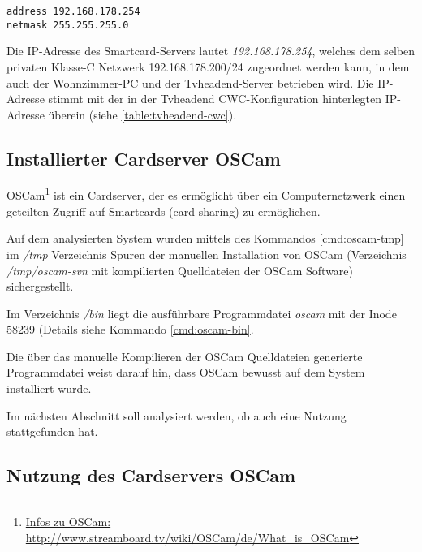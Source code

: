 \begin{verbatim}
address 192.168.178.254
netmask 255.255.255.0
\end{verbatim}

Die IP-Adresse des Smartcard-Servers lautet \textit{192.168.178.254}, welches dem selben privaten \mbox{Klasse-C} Netzwerk 192.168.178.200/24 zugeordnet werden kann, in dem auch der Wohnzimmer-PC und der Tvheadend-Server betrieben wird. Die IP-Adresse stimmt mit der in der Tvheadend CWC-Konfiguration hinterlegten IP-Adresse überein (siehe \autoref{table:tvheadend-cwc}).

\subsection{Installierter Cardserver OSCam}

OSCam\footnote{\href{http://www.streamboard.tv/wiki/OSCam/de/What\_is\_OSCam}{Infos zu OSCam: http://www.streamboard.tv/wiki/OSCam/de/What\_is\_OSCam}} ist ein Cardserver, der es ermöglicht über ein Computernetzwerk einen geteilten Zugriff auf Smartcards (card sharing) zu ermöglichen.

Auf dem analysierten System wurden mittels des Kommandos \autoref{cmd:oscam-tmp} im \textit{/tmp} Verzeichnis Spuren der manuellen Installation von OSCam (Verzeichnis \textit{/tmp/oscam-svn} mit kompilierten Quelldateien der OSCam Software) sichergestellt. 

Im Verzeichnis \textit{/bin} liegt die ausführbare Programmdatei \textit{oscam} mit der Inode 58239 (Details siehe Kommando \autoref{cmd:oscam-bin}.

Die über das manuelle Kompilieren der OSCam Quelldateien generierte Programmdatei weist darauf hin, dass OSCam bewusst auf dem System installiert wurde. 

Im nächsten Abschnitt soll analysiert werden, ob auch eine Nutzung stattgefunden hat.

\subsection{Nutzung des Cardservers OSCam}

